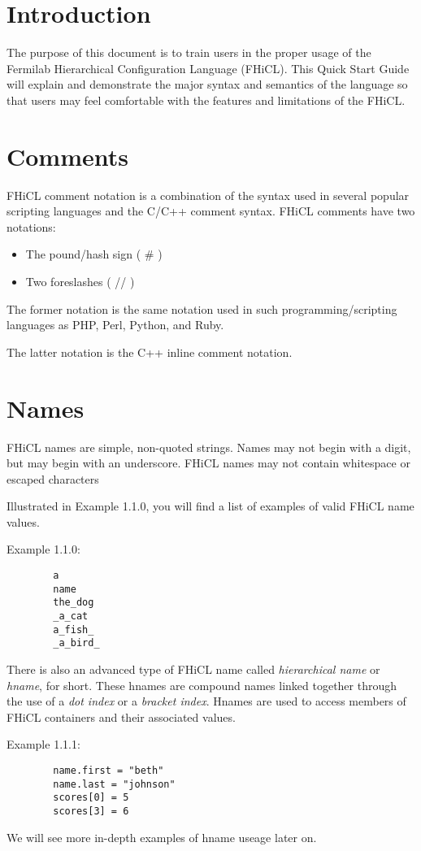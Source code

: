 \documentclass{memarticle}
\begin{document}
\topmatter
\setlength{\parindent}{0in}
\newpage

\chapter{Introduction}
	The purpose of this document is to train users in the proper usage
	of the Fermilab Hierarchical Configuration Language (FHiCL).
	This Quick Start Guide will explain and demonstrate the major syntax and semantics
	of the language so that users may feel comfortable with the features
	and limitations of the FHiCL.

\chapter{Comments}
	FHiCL comment notation is a combination of the syntax used in several popular scripting languages and the C/C++ comment syntax.
	FHiCL comments have two notations:
	\begin{itemize}
		\item The pound/hash sign ( \# )
		\item Two foreslashes ( // )
	\end{itemize}
	\par
	The former notation is the same notation used in such programming/scripting languages as
	PHP, Perl, Python, and Ruby.
	\par
	The latter notation is the C++ inline comment notation.
	\par
\chapter{Names}
	FHiCL names are simple, non-quoted strings.
	Names may not begin with a digit,
	but may begin with an underscore.
	FHiCL names may not contain whitespace or escaped characters
	\par
	Illustrated in Example 1.1.0,
	you will find a list of examples of valid FHiCL name values.
	\par
	Example 1.1.0:
	\begin{verbatim}
		a
		name
		the_dog
		_a_cat
		a_fish_
		_a_bird_
	\end{verbatim}
	\par
	There is also an advanced type of FHiCL name called 
	\emph{hierarchical name} or \emph{hname}, for short.
	These hnames are compound names linked together through the use of
	a \emph{dot index} or a \emph{bracket index}.
	Hnames are used to access members of FHiCL containers
	and their associated values.
	\par
	Example 1.1.1:
	\begin{verbatim}
		name.first = "beth"
		name.last = "johnson"
		scores[0] = 5
		scores[3] = 6
	\end{verbatim}
	\par
	We will see more in-depth examples of hname useage later on.
\end{document}
